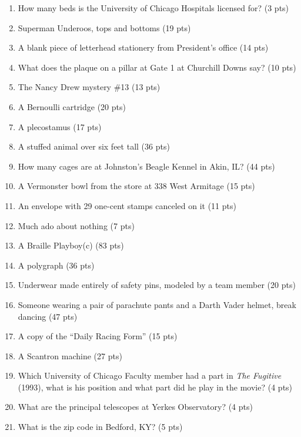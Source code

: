 \begin{enumerate}
\item How many beds is the University of Chicago Hospitals licensed for? (3 pts)
\item Superman Underoos{\texttrademark}, tops and bottoms (19 pts)
\item A blank piece of letterhead stationery from {\UofC} President's office (14 pts)
\item What does the plaque on a pillar at Gate 1 at Churchill Downs say? (10 pts)
\item The Nancy Drew{\texttrademark} mystery \#13 (13 pts)
\item A Bernoulli{\texttrademark} cartridge (20 pts)
\item A plecostamus (17 pts)
\item A stuffed animal over six feet tall (36 pts)
\item How many cages are at Johnston's Beagle Kennel in Akin, IL? (44 pts)
\item A Vermonster{\texttrademark} bowl from the store at 338 West Armitage (15 pts)
\item An envelope with 29 one-cent stamps canceled on it (11 pts)
\item Much ado about nothing (7 pts)
\item A Braille Playboy(c) (83 pts)
\item A polygraph (36 pts)
\item Underwear made entirely of safety pins, modeled by a team member (20 pts)
\item Someone wearing a pair of parachute pants and a Darth Vader{\texttrademark} helmet, break dancing (47 pts)
\item A copy of the ``Daily Racing Form'' (15 pts)
\item A Scantron{\texttrademark} machine (27 pts)
\item Which University of Chicago Faculty member had a part in {\it The Fugitive} (1993), what is his position and what part did he play in the movie? (4 pts)
\item What are the principal telescopes at Yerkes Observatory? (4 pts)
\item What is the zip code in Bedford, KY? (5 pts)


\end{enumerate}
